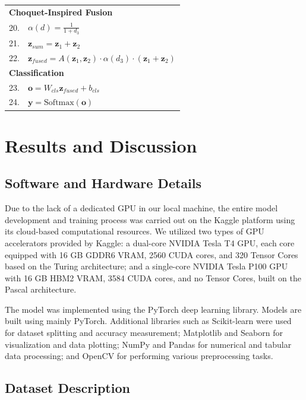 \documentclass[preprint,12pt]{elsarticle}
\begin{document}
\begin{table}[!h]
\begin{tabular}{@{}ll@{}}
\midrule
\multicolumn{2}{l}{\textbf{Choquet-Inspired Fusion}} \\

20. & $\alpha(d)=\frac{1}{1+d_3}$ \\
21. & $\mathbf{z}_{sum}=\mathbf{z}_1+\mathbf{z}_2$ \\
22. & $\mathbf{z}_{fused}=A(\mathbf{z}_1,\mathbf{z}_2)\cdot
\alpha(d_3)\cdot (\mathbf{z}_1+\mathbf{z}_2)$ \\

\midrule
\multicolumn{2}{l}{\textbf{Classification}} \\

23. & $\mathbf{o} = W_{cls}\mathbf{z}_{fused} + b_{cls}$ \\
24. & $\mathbf{y} = \text{Softmax}(\mathbf{o})$ \\

\bottomrule
\end{tabular}

\end{table}

\FloatBarrier
\section{Results and Discussion}

\subsection{Software and Hardware Details}

Due to the lack of a dedicated GPU in our local machine, the entire model development and training process was carried out on the Kaggle platform using its cloud-based computational resources. We utilized two types of GPU accelerators provided by Kaggle: a dual-core NVIDIA Tesla T4 GPU, each core equipped with 16 GB GDDR6 VRAM, 2560 CUDA cores, and 320 Tensor Cores based on the Turing architecture; and a single-core NVIDIA Tesla P100 GPU with 16 GB HBM2 VRAM, 3584 CUDA cores, and no Tensor Cores, built on the Pascal architecture.

The model was implemented using the PyTorch deep learning library. Models are built using mainly PyTorch. Additional libraries such as Scikit-learn were used for dataset splitting and accuracy measurement; Matplotlib and Seaborn for visualization and data plotting; NumPy and Pandas for numerical and tabular data processing; and OpenCV for performing various preprocessing tasks.

\subsection{Dataset Description}
\end{document}
